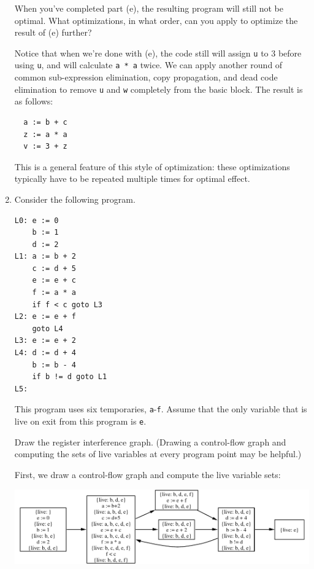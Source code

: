 \documentclass[11pt]{article}
\begin{document}
\begin{enumerate}
When you've completed part (e), the resulting program will still not
be optimal.  What optimizations, in what order, can you apply to
optimize the result of (e) further?

Notice that when we're done with (e), the code still will assign
\texttt{u} to $3$ before using \texttt{u}, and will calculate
\texttt{a * a} twice.  We can apply another round of common
sub-expression elimination, copy propagation, and dead code
elimination to remove \texttt{u} and \texttt{w} completely from the
basic block.  The result is as follows:
\begin{verbatim}
  a := b + c
  z := a * a
  v := 3 + z
\end{verbatim}
This is a general feature of this style of optimization: these
optimizations typically have to be repeated multiple times for optimal
effect.

\item
Consider the following program.
\begin{verbatim}
L0: e := 0
    b := 1
    d := 2
L1: a := b + 2
    c := d + 5
    e := e + c
    f := a * a
    if f < c goto L3
L2: e := e + f
    goto L4
L3: e := e + 2
L4: d := d + 4
    b := b - 4
    if b != d goto L1
L5:
\end{verbatim}
This program uses six temporaries, \texttt{a}-\texttt{f}.  Assume that
the only variable that is live on exit from this program is
\texttt{e}.

Draw the register interference graph.  (Drawing a control-flow graph
and computing the sets of live variables at every program point may be
helpful.)

First, we draw a control-flow graph and compute the live variable
sets:
\begin{center}
\includegraphics[scale=0.85]{livevars}
\end{center}


\end{enumerate}
\end{document}
